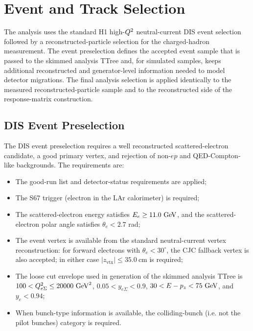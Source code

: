 \section{Event and Track Selection}
\label{sec:selection}

The analysis uses the standard H1 high-$Q^{2}$ neutral-current DIS event
selection followed by a reconstructed-particle selection for the
charged-hadron measurement.  The event preselection defines the accepted event
sample that is passed to the skimmed analysis TTree and, for simulated samples, keeps additional reconstructed and generator-level
information needed to model detector migrations.  The final analysis selection
is applied identically to the measured reconstructed-particle sample and to the
reconstructed side of the response-matrix construction.

\subsection{DIS Event Preselection}
\label{sec:selection:preselection}

The DIS event preselection requires a well reconstructed scattered-electron
candidate, a good primary vertex, and rejection of non-$ep$ and QED-Compton-like
backgrounds.  The requirements are:
\begin{itemize}
  \item The good-run list and detector-status requirements are applied;
  \item The S67 trigger (electron in the LAr calorimeter) is required;
  \item The scattered-electron energy satisfies $E_e \ge 11.0~\text{GeV}$, and the
        scattered-electron polar angle satisfies $\theta_e < 2.7$ rad;
  \item The event vertex is available from the standard neutral-current vertex
        reconstruction: for forward electrons with $\theta_e<30^\circ$, the CJC
        fallback vertex is also accepted; in either case
        $|z_{\mathrm{vtx}}| \le 35.0~\mathrm{cm}$ is required;
  \item The loose cut envelope used in generation of the skimmed analysis TTree is
        $100 < Q^2_{e\Sigma} \le 20000~\text{GeV}^{2}$,
        $0.05 < y_{e\Sigma} < 0.9$, $30 < E-p_z < 75~\text{GeV}$, and
        $y_e < 0.94$;
  \item When bunch-type information is available, the colliding-bunch (i.e. not the pilot bunches) category 
        is required.
\end{itemize}

